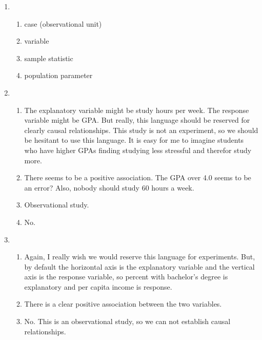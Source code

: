 \documentclass[12pt,letterpaper]{article}
\begin{document}
\begin{enumerate}
\item
\begin{enumerate}
\item case (observational unit) %
\item variable
\item sample statistic
\item population parameter
\end{enumerate}

\item
\begin{enumerate}
\item The explanatory variable might be study hours per week. The response variable might be GPA. But really, this language should be reserved for clearly causal relationships. This study is not an experiment, so we should be hesitant to use this language. It is easy for me to imagine students who have higher GPAs finding studying less stressful and therefor study more.
\item There seems to be a positive association. The GPA over 4.0 seems to be an error? Also, nobody should study 60 hours a week.
\item Observational study.
\item No. 
\end{enumerate}

\item
\begin{enumerate}
\item Again, I really wish we would reserve this language for experiments. But, by default the horizontal axis is the explanatory variable and the vertical axis is the response variable, so percent with bachelor's degree is explanatory and per capita income is response.
\item There is a clear positive association between the two variables.
\item No. This is an observational study, so we can not establish causal relationships.
\end{enumerate}





\end{enumerate}
\end{document}
